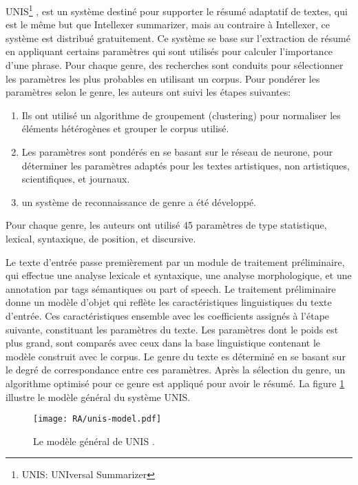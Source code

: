 \documentclass[a4paper,12pt,oneside]{../use/ESIthesis}
\begin{document}
UNIS\footnote{UNIS: UNIversal Summarizer} \cite{10-yatsko-al}, est un système destiné pour supporter le résumé adaptatif de textes, qui est le même but que Intellexer summarizer, mais au contraire à Intellexer, ce système est distribué gratuitement. 
Ce système se base sur l'extraction de résumé en appliquant certains paramètres qui sont utilisés pour calculer l'importance d'une phrase. 
Pour chaque genre, des recherches sont conduits pour sélectionner les paramètres les plus probables en utilisant un corpus. 
Pour pondérer les paramètres selon le genre, les auteurs ont suivi les étapes suivantes: 
\begin{enumerate}
\item Ils ont utilisé un algorithme de groupement (clustering) pour normaliser les éléments hétérogènes et grouper le corpus utilisé. 
\item Les paramètres sont pondérés en se basant sur le réseau de neurone, pour déterminer les paramètres adaptés pour les textes artistiques, non artistiques, scientifiques, et journaux.
\item un système de reconnaissance de genre a été développé.
\end{enumerate}
Pour chaque genre, les auteurs ont utilisé 45 paramètres de type statistique, lexical, syntaxique, de position, et discursive.

Le texte d'entrée passe premièrement par un module de traitement préliminaire, qui effectue une analyse lexicale et syntaxique, une analyse morphologique, et une annotation par tags sémantiques ou part of speech. 
Le traitement préliminaire donne un modèle d'objet qui reflète les caractéristiques linguistiques du texte d'entrée. 
Ces caractéristiques ensemble avec les coefficients assignés à l'étape suivante, constituant les paramètres du texte. 
Les paramètres dont le poids est plus grand, sont comparés avec ceux dans la base linguistique contenant le modèle construit avec le corpus. 
Le genre du texte es déterminé en se basant sur le degré de correspondance entre ces paramètres. 
Après la sélection du genre, un algorithme optimisé pour ce genre est appliqué pour avoir le résumé. 
La figure \ref{fig:unis-model} illustre le modèle général du système UNIS. 

\begin{figure}[ht]
\begin{center}
\texttt{[image: RA/unis-model.pdf]} %
\caption[Le modèle général de UNIS]{Le modèle général de UNIS \cite{10-yatsko-al}.}
\label{fig:unis-model}
\end{center}
\end{figure}
\end{document}
